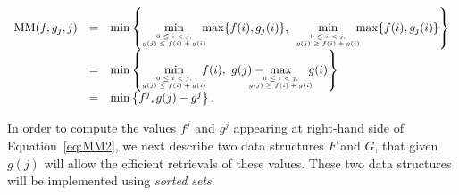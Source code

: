 \begin{equation}
\label{eq:MM2} 
	\begin{array}{rcl}
		\text{MM}(f, g_j, j) & = & \min\left\{
			\hspace{-.5em}\min\limits_{{\tiny\begin{array}{c}
				0 \leq i < j, \\
				g(j) \leq f(i) + g(i)
			\end{array}}} \hspace{-1em} \max\{f(i), g_j(i)\},
			\min\limits_{{\tiny \begin{array}{c}
				0 \leq i < j, \\
				g(j) \geq f(i) + g(i)
			\end{array}}} \hspace{-1em} \max\{f(i), g_j(i)\}
		\right\} \\
		& = & \min\left\{
			\hspace{-.5em}\min\limits_{{\tiny \begin{array}{c}
				0 \leq i < j, \\
				g(j) \leq f(i) + g(i)
				\end{array}}} \hspace{-1em} f(i), \ 
			g(j) - \hspace{-2em}\max\limits_{{\tiny\begin{array}{c}
				0 \leq i < j, \\
				g(j) \geq f(i) + g(i)
				\end{array}}} \hspace{-1em} g(i)
		\right\} \\
		& = & \min\left\{f^j, g(j) - g^j\right\}.
	\end{array}
\end{equation}

In order to compute the values $f^j$ and $g^j$ appearing at right-hand side of Equation~\ref{eq:MM2}, we next describe two data structures $F$ and $G$, that given $g(j)$ will allow the efficient retrievals of these values.
These two data structures will be implemented using \emph{sorted sets}.

